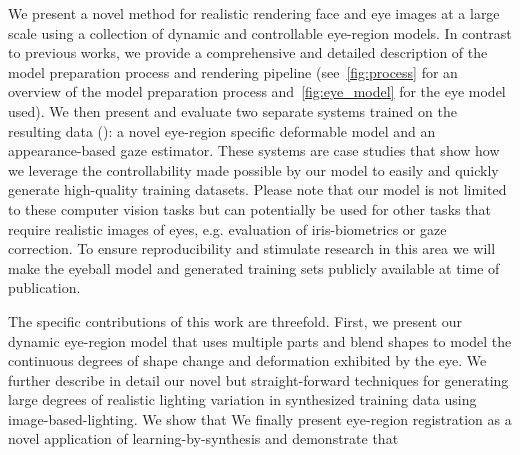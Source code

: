 


We present a novel method for realistic rendering face and eye images at a large scale using a collection of dynamic and controllable eye-region models.
In contrast to previous works, we provide a comprehensive and detailed description of the model preparation process and rendering pipeline (see~\autoref{fig:process} for an overview of the model preparation process and~\autoref{fig:eye_model} for the eye model used).
We then present and evaluate two separate systems trained on the resulting data (\emph{\dataset}): a novel eye-region specific deformable model and an appearance-based gaze estimator.
These systems are case studies that show how we leverage the controllability made possible by our model to easily and quickly generate high-quality training datasets.
Please note
that our model is not limited to these computer vision tasks but can potentially be used for other tasks that require realistic images of eyes, e.g. evaluation of iris-biometrics or gaze correction.
To ensure reproducibility and stimulate research in this area we will make the eyeball model and generated training sets publicly available at time of publication.

The specific contributions of this work are threefold.
First, we present our dynamic eye-region model that uses multiple parts and blend shapes to model the continuous degrees of shape change and deformation exhibited by the eye.
We further describe in detail our novel but straight-forward techniques for generating large degrees of realistic lighting variation in synthesized training data using image-based-lighting.
We show that 
We finally present eye-region registration as a novel application of learning-by-synthesis and demonstrate that 